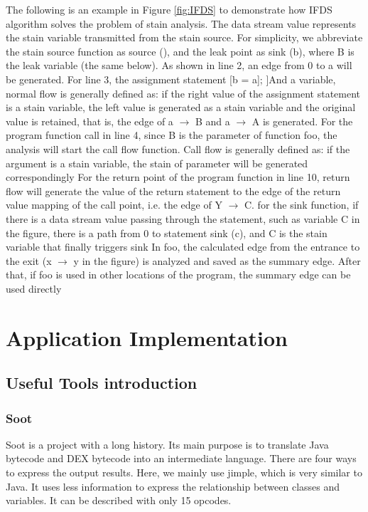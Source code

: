 \documentclass{article}
\begin{document}
The following is an example in Figure \ref{fig:IFDS} to demonstrate how IFDS algorithm solves the problem of stain analysis. The data stream value represents the stain variable transmitted from the stain source. For simplicity, we abbreviate the stain source function as source (), and the leak point as sink (b), where B is the leak variable (the same below). As shown in line 2, an edge from 0 to a will be generated. For line 3, the assignment statement [b = a]; ]And a variable, normal flow is generally defined as: if the right value of the assignment statement is a stain variable, the left value is generated as a stain variable and the original value is retained, that is, the edge of a $\rightarrow$ B and a $\rightarrow$ A is generated. For the program function call in line 4, since B is the parameter of function foo, the analysis will start the call flow function. Call flow is generally defined as: if the argument is a stain variable, the stain of parameter will be generated correspondingly For the return point of the program function in line 10, return flow will generate the value of the return statement to the edge of the return value mapping of the call point, i.e. the edge of Y $\rightarrow$ C. for the sink function, if there is a data stream value passing through the statement, such as variable C in the figure, there is a path from 0 to statement sink (c), and C is the stain variable that finally triggers sink In foo, the calculated edge from the entrance to the exit (x $\rightarrow$ y in the figure) is analyzed and saved as the summary edge. After that, if foo is used in other locations of the program, the summary edge can be used directly

\section{Application Implementation}
\subsection{Useful Tools introduction}
\subsubsection{Soot}
Soot is a project with a long history. Its main purpose is to translate Java bytecode and DEX bytecode into an intermediate language. There are four ways to express the output results. Here, we mainly use jimple, which is very similar to Java. It uses less information to express the relationship between classes and variables. It can be described with only 15 opcodes.
\end{document}
